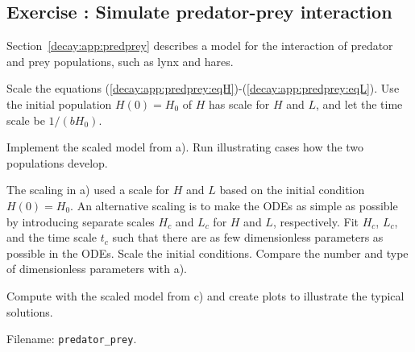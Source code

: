\documentclass[graybox,sectrefs,envcountresetchap,open=right,final]{svmonodo}
\newenvironment{doconceexercise}{}{}
\newcounter{doconceexercisecounter}
\begin{document}
\begin{doconceexercise}

\subsection*{Exercise \thedoconceexercisecounter: Simulate predator-prey interaction}

\label{decay:app:exer:predprey}

Section~\ref{decay:app:predprey} describes a model for the
interaction of predator and prey populations, such as lynx and hares.


Scale the equations (\ref{decay:app:predprey:eqH})-(\ref{decay:app:predprey:eqL}).
Use the initial population $H(0)=H_0$ of $H$ has scale for $H$ and $L$, and
let the time scale be $1/(bH_0)$.



Implement the scaled model from a). Run illustrating cases how the
two populations develop.



The scaling in a) used a scale for $H$ and $L$ based on the
initial condition $H(0)=H_0$. An alternative scaling is to make
the ODEs as simple as possible by introducing separate scales
$H_c$ and $L_c$ for $H$ and $L$, respectively. Fit $H_c$,
$L_c$, and the time scale $t_c$ such that there are as few
dimensionless parameters as possible in the ODEs. Scale the initial
conditions. Compare the number and type of dimensionless parameters
with a).



Compute with the scaled model from c) and create plots to illustrate
the typical solutions.



\noindent Filename: \Verb!predator_prey!.

\end{doconceexercise}
\end{document}
